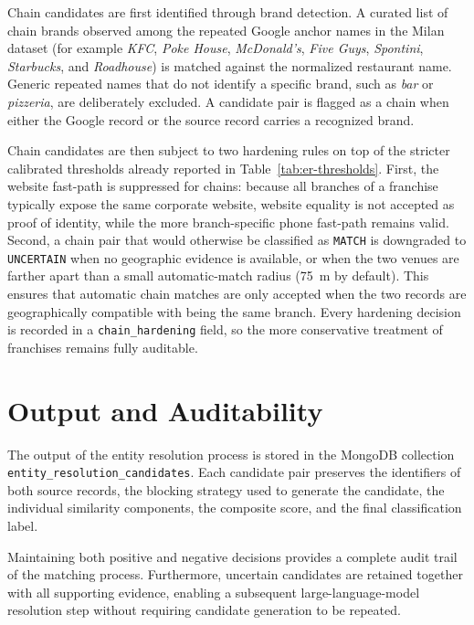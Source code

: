 Chain candidates are first identified through brand detection. A curated list of
chain brands observed among the repeated Google anchor names in the Milan dataset
(for example \textit{KFC}, \textit{Poke House}, \textit{McDonald's},
\textit{Five Guys}, \textit{Spontini}, \textit{Starbucks}, and \textit{Roadhouse})
is matched against the normalized restaurant name. Generic repeated names that do
not identify a specific brand, such as \textit{bar} or \textit{pizzeria}, are
deliberately excluded. A candidate pair is flagged as a chain when either the
Google record or the source record carries a recognized brand.

Chain candidates are then subject to two hardening rules on top of the stricter
calibrated thresholds already reported in Table~\ref{tab:er-thresholds}. First, the
website fast-path is suppressed for chains: because all branches of a franchise
typically expose the same corporate website, website equality is not accepted as
proof of identity, while the more branch-specific phone fast-path remains valid.
Second, a chain pair that would otherwise be classified as \texttt{MATCH} is
downgraded to \texttt{UNCERTAIN} when no geographic evidence is available, or when
the two venues are farther apart than a small automatic-match radius (75~m by
default). This ensures that automatic chain matches are only accepted when the two
records are geographically compatible with being the same branch. Every hardening
decision is recorded in a \texttt{chain\_hardening} field, so the more conservative
treatment of franchises remains fully auditable.

\section{Output and Auditability}

The output of the entity resolution process is stored in the MongoDB collection \\
\texttt{entity\_resolution\_candidates}. Each candidate pair preserves the identifiers of both source records, the blocking strategy used to generate the candidate, the individual similarity components, the composite score, and the final classification label.

Maintaining both positive and negative decisions provides a complete audit trail of the matching process. Furthermore, uncertain candidates are retained together with all supporting evidence, enabling a subsequent large-language-model resolution step without requiring candidate generation to be repeated.

